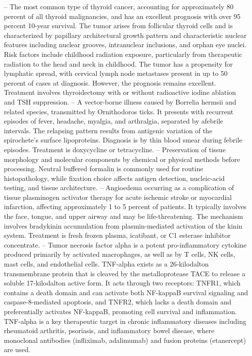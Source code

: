 -- The most common type of thyroid cancer, accounting for approximately 80 percent of all thyroid malignancies, and has an excellent prognosis with over 95 percent 10-year survival. The tumor arises from follicular thyroid cells and is characterized by papillary architectural growth pattern and characteristic nuclear features including nuclear grooves, intranuclear inclusions, and orphan eye nuclei. Risk factors include childhood radiation exposure, particularly from therapeutic radiation to the head and neck in childhood. The tumor has a propensity for lymphatic spread, with cervical lymph node metastases present in up to 50 percent of cases at diagnosis. However, the prognosis remains excellent. Treatment involves thyroidectomy with or without radioactive iodine ablation and TSH suppression.
-- A vector-borne illness caused by Borrelia hermsii and related species, transmitted by Ornithodoros ticks. It presents with recurrent episodes of fever, headache, myalgia, and arthralgia, separated by afebrile intervals. The relapsing pattern results from antigenic variation of the spirochete's surface lipoproteins. Diagnosis is by thin blood smear during febrile episodes. Treatment is doxycycline or tetracycline.
-- Preservation of tissue morphology and molecular components by chemical or physical methods before processing. Neutral buffered formalin is commonly used for routine histopathology, while fixation choice affects antigen detection, nucleic-acid testing, and tissue architecture.
-- Angioedema occurring as a complication of tissue plasminogen activator therapy for acute ischemic stroke or myocardial infarction, affecting approximately 1 to 5 percent of patients. It typically involves the face, tongue, and upper airway and may be life-threatening. The mechanism involves bradykinin accumulation from plasmin-mediated activation of the kinin system. Treatment is fresh frozen plasma, icatibant, or C1 esterase inhibitor concentrate.
-- Tumor necrosis factor alpha is a potent pro-inflammatory cytokine produced primarily by activated macrophages, as well as by T cells, NK cells, mast cells, and endothelial cells. TNF-alpha exists as a 26-kilodalton transmembrane protein that is cleaved by the metalloprotease TACE to release a soluble 17-kilodalton active form. It acts through two receptors: TNFR1, which contains a death domain and can activate both NF-kappaB survival signaling and caspase-8-mediated apoptosis, and TNFR2, which lacks a death domain and preferentially activates NF-kappaB, promoting cell survival and inflammation. TNF-alpha is a key therapeutic target in chronic inflammatory diseases including rheumatoid arthritis, psoriasis, and inflammatory bowel disease, where monoclonal antibodies (infliximab, adalimumab) and fusion proteins (etanercept) are used.
